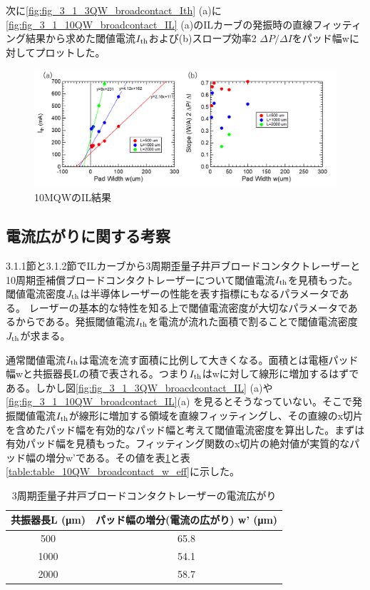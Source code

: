 次に\ref{fig:fig_3_1_3QW_broadcontact_Ith} (a)に\ref{fig:fig_3_1_10QW_broadcontact_IL} (a)のILカーブの発振時の直線フィッティング結果から求めた閾値電流$I_{\rm{th}}$および(b)スロープ効率2 $\Delta P/\Delta I$をパッド幅wに対してプロットした。
\begin{figure}[h]
	\centering
	\includegraphics[width=15cm]{figure/fig_3_1_10QW_broadcontact_Ith.png}
		\caption{10MQWのIL結果}
		\label{fig:fig_3_1_10QW_broadcontact_Ith}
\end{figure}

\subsection{電流広がりに関する考察}%
3.1.1節と3.1.2節でILカーブから3周期歪量子井戸ブロードコンタクトレーザーと10周期歪補償ブロードコンタクトレーザーについて閾値電流$I_{\rm{th}}$を見積もった。閾値電流密度$J_{\rm{th}}$は半導体レーザーの性能を表す指標にもなるパラメータである。
レーザーの基本的な特性を知る上で閾値電流密度が大切なパラメータであるからである。発振閾値電流$I_{\rm{th}}$を電流が流れた面積で割ることで閾値電流密度$J_{\rm{th}}$が求まる。

通常閾値電流$I_{\rm{th}}$は電流を流す面積に比例して大きくなる。面積とは電極パッド幅wと共振器長Lの積で表される。つまり$I_{\rm{th}}$はwに対して線形に増加するはずである。しかし図\ref{fig:fig_3_1_3QW_broacdcontact_IL} (a)や\ref{fig:fig_3_1_10QW_broadcontact_IL}(a) を見るとそうなっていない。そこで発振閾値電流$I_{\rm{th}}$が線形に増加する領域を直線フィッティングし、その直線のx切片を含めたパッド幅を有効的なパッド幅と考えて閾値電流密度を算出した。まずは有効パッド幅を見積もった。フィッティング関数のx切片の絶対値が実質的なパッド幅の増分w'である。その値を表\ref{table:table_3QW_broadcontact_w_eff}と表\ref{table:table_10QW_broadcontact_w_eff}に示した。
\begin{table}[h]
  \caption{3周期歪量子井戸ブロードコンタクトレーザーの電流広がり}
  \label{table:table_3QW_broadcontact_w_eff}
  \centering
  \begin{tabular}{cc}
    \hline
    共振器長L (\si{\micro\metre})  & パッド幅の増分(電流の広がり) w' (\si{\micro\metre})   \\
    \hline \hline
     500 & 65.8  \\
    1000  & 54.1 \\
    2000  & 58.7 \\ 
    \hline
  \end{tabular}
\end{table}

